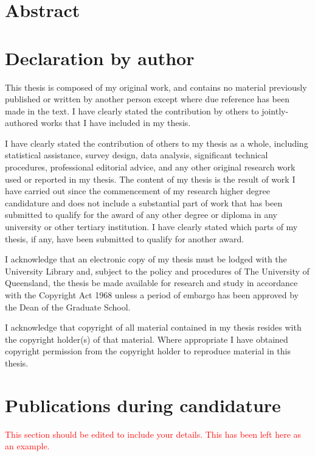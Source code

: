 \cleardoublepage

\section*{Abstract}

 

\clearpage
\section*{Declaration by author}

  This thesis is composed of my original work, and contains no material previously published or written by another person except where due reference has been made in the text. I have clearly stated the contribution by others to jointly-authored works that I have included in my thesis.

  I have clearly stated the contribution of others to my thesis as a whole, including statistical assistance, survey design, data analysis, significant technical procedures, professional editorial advice, and any other original research work used or reported in my thesis. The content of my thesis is the result of work I have carried out since the commencement of my research higher degree candidature and does not include a substantial part of work that has been submitted to qualify for the award of any other degree or diploma in any university or other tertiary institution. I have clearly stated which parts of my thesis, if any, have been submitted to qualify for another award.

  I acknowledge that an electronic copy of my thesis must be lodged with the University Library and, subject to the policy and procedures of The University of Queensland, the thesis be made available for research and study in accordance with the Copyright Act 1968 unless a period of embargo has been approved by the Dean of the Graduate School.

  I acknowledge that copyright of all material contained in my thesis resides with the copyright holder(s) of that material. Where appropriate I have obtained copyright permission from the copyright holder to reproduce material in this thesis.

\clearpage
\section*{Publications during candidature}

\textcolor{red}{This section should be edited to include your details. This has been left here as an example.}

